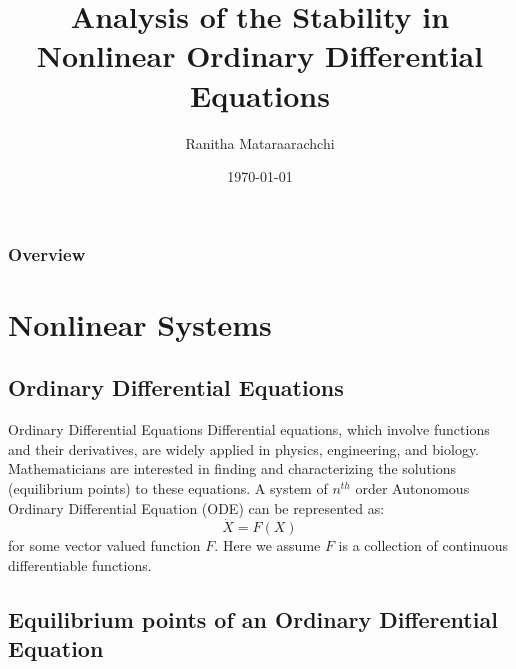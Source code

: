 \documentclass{beamer}
\title[Math Report]{Analysis of the Stability in Nonlinear Ordinary Differential
Equations} %
\author{Ranitha Mataraarachchi} %
\institute[UoP] %
{
Department of Engineering Mathematics, University of Peradeniya, Sri Lanka \\ %
\medskip
\textit{Ranitha Mataraarachchi} %
}
\date{\today} %
\begin{document}
\begin{frame}
\titlepage %
\end{frame}

\begin{frame}
\frametitle{Overview} %
\tableofcontents %
\end{frame}


\section{Nonlinear Systems} 
\subsection{Ordinary Differential Equations} 
\begin{frame}{Ordinary Differential Equations}
    Differential equations, which involve functions and their derivatives, are widely applied in physics, engineering, and biology. Mathematicians are interested in finding and characterizing the solutions (equilibrium points) to these equations. 
    \newline
    \newline
    A system of $n^{th}$ order Autonomous Ordinary Differential Equation (ODE) can be represented as:
    \begin{equation}\label{auto}
        \dot{X} = F(X)
    \end{equation}
    for some vector valued function $F$. Here we assume $F$ is a collection of continuous differentiable functions.
\end{frame}



\subsection{Equilibrium points of an Ordinary Differential Equation}
\end{document}
